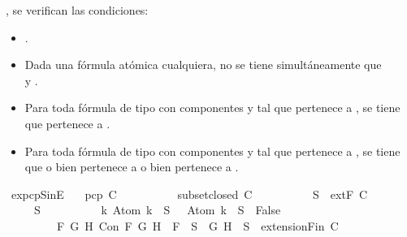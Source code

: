 \begin{isabellebody}
\begin{isamarkuptext}
  , se verifican las condiciones:
  \begin{itemize}
    \item {}.
    \item Dada  una fórmula atómica cualquiera, no se tiene 
    simultáneamente que\\  y .
    \item Para toda fórmula de tipo \isa{{\isasymalpha}} con componentes  y  tal que \isa{{\isasymalpha}}
    pertenece a , se tiene que  pertenece a .
    \item Para toda fórmula de tipo \isa{{\isasymbeta}} con componentes  y  tal que \isa{{\isasymbeta}}
    pertenece a , se tiene que o bien  pertenece a  o 
    bien  pertenece a .
  \end{itemize}%
\end{isamarkuptext}\isamarkuptrue%
\isamarkupfalse%
\ ex{}{\isacharunderscore}pcp{\isacharunderscore}SinE{\isacharcolon}\isanewline
\ \ \ {\isachardoublequoteopen}pcp\ C{\isachardoublequoteclose}\isanewline
\ \ \ \ \ \ \ \ \ \ {\isachardoublequoteopen}subset{\isacharunderscore}closed\ C{\isachardoublequoteclose}\isanewline
\ \ \ \ \ \ \ \ \ \ {\isachardoublequoteopen}S\ {\isasymin}\ {\isacharparenleft}extF\ C{\isacharparenright}{\isachardoublequoteclose}\ \isanewline
\ \ \ {\isachardoublequoteopen}{\isasymbottom}\ {\isasymnotin}\ S\ {\isasymand}\isanewline
\ \ \ \ \ \ \ \ \ {\isacharparenleft}{\isasymforall}k{\isachardot}\ Atom\ k\ {\isasymin}\ S\ {\isasymlongrightarrow}\ \isactrlbold {\isasymnot}\ {\isacharparenleft}Atom\ k{\isacharparenright}\ {\isasymin}\ S\ {\isasymlongrightarrow}\ False{\isacharparenright}\ {\isasymand}\isanewline
\ \ \ \ \ \ \ \ \ {\isacharparenleft}{\isasymforall}F\ G\ H{\isachardot}\ Con\ F\ G\ H\ {\isasymlongrightarrow}\ F\ {\isasymin}\ S\ {\isasymlongrightarrow}\ {\isacharbraceleft}G{\isacharcomma}\ H{\isacharbraceright}\ {\isasymunion}\ S\ {\isasymin}\ {\isacharparenleft}extensionFin\ C{\isacharparenright}{\isacharparenright}\ {\isasymand}\isanewline

\end{isabellebody}
